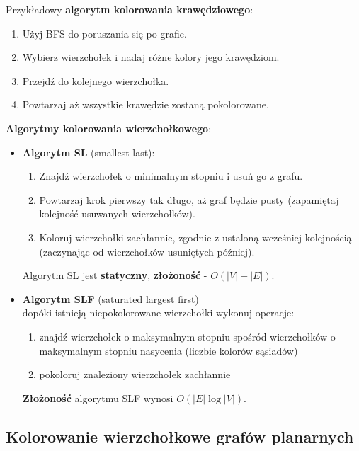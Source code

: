 \documentclass[main.tex]{subfiles}
\begin{document}
    \noindent Przykładowy \textbf{algorytm kolorowania krawędziowego}:
    \begin{enumerate}[noitemsep]
        \item Użyj BFS do poruszania się po grafie.
        \item Wybierz wierzchołek i nadaj różne kolory jego krawędziom.
        \item Przejdź do kolejnego wierzchołka.
        \item Powtarzaj aż wszystkie krawędzie zostaną pokolorowane.
    \end{enumerate}

    \noindent \textbf{Algorytmy kolorowania wierzchołkowego}:
    \begin{itemize}
        \item \textbf{Algorytm SL} (smallest last):
        \begin{enumerate}[noitemsep]
            \item Znajdź wierzchołek o minimalnym stopniu i usuń go z grafu.
            \item Powtarzaj krok pierwszy tak długo, aż graf będzie pusty (zapamiętaj kolejność usuwanych wierzchołków).
            \item Koloruj wierzchołki zachłannie, zgodnie z ustaloną wcześniej kolejnością (zaczynając od wierzchołków usuniętych później).
        \end{enumerate}
        Algorytm SL jest \textbf{statyczny}, \textbf{złożoność} - $O(|V|+|E|)$.

        \item \textbf{Algorytm SLF} (saturated largest first)\\
        dopóki istnieją niepokolorowane wierzchołki wykonuj operacje:
        \begin{enumerate}[noitemsep]
            \item znajdź wierzchołek o maksymalnym stopniu spośród wierzchołków o maksymalnym stopniu nasycenia
            (liczbie kolorów sąsiadów)
            \item pokoloruj znaleziony wierzchołek zachłannie
        \end{enumerate}
        \textbf{Złożoność} algorytmu SLF wynosi $O(|E|\log |V|)$.
    \end{itemize}


    \subsection{Kolorowanie wierzchołkowe grafów planarnych}
\end{document}
